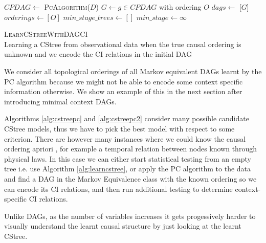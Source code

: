 \documentclass{tufte-book}
\begin{document}
\begin{algorithm}\label{alg:cstreepc2}
\SetAlgoLined
{}
$CPDAG \gets$ \textsc{PcAlgorithm}($D$)\;
{
$G \gets g \in CPDAG$ with ordering $O$\;
$dags \gets$ [$G$]\;
$orderings \gets [O]$\;
}
$min\_stage\_trees \gets []$\;
$min\_stage \gets \infty$\;
\caption{\textsc{LearnCStreeWithDAGCI} \\ Learning a CStree from observational data when the true causal ordering is unknown and we encode the CI relations in the initial DAG}

\end{algorithm}




We consider all topological orderings of all Markov equivalent DAGs learnt by the PC algorithm because we might not be able to encode some context specific information otherwise. We show an example of this in the next section after introducing minimal context DAGs.

Algorithms \ref{alg:cstreepc} and \ref{alg:cstreepc2} consider many possible candidate CStree models, thus we have to pick the best model with respect to some criterion. There are however many instances where we could know the causal ordering apriori \cite{thwaites-2010-causal-analy,silander-2013}, for example a temporal relation between nodes known through physical laws. In this case we can either start statistical testing from an empty tree i.e. use Algorithm \ref{alg:learncstree}, or apply the PC algorithm to the data and find a DAG in the Markov Equivalence class with the known ordering so we can encode its CI relations, and then run additional testing to determine context-specific CI relations.



Unlike DAGs, as the number of variables increases it gets progessively harder to visually understand the learnt causal structure by just looking at the learnt CStree.
\end{document}

